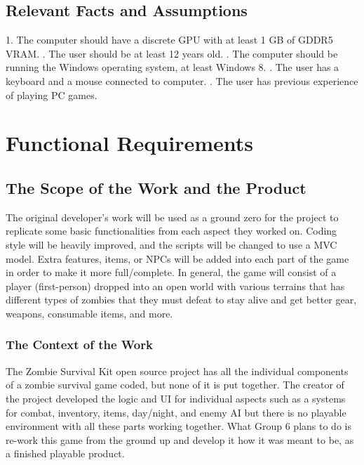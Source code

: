 \documentclass[12pt, titlepage]{article}
\begin{document}
\subsection{Relevant Facts and Assumptions}

1. The computer should have a discrete GPU with at least 1 GB of GDDR5 VRAM.
\newline
{}. The user should be at least 12 years old.
\newline
{}. The computer should be running the Windows operating system, at least Windows 8.
\newline
{}. The user has a keyboard and a mouse connected to computer.
\newline
{}. The user has previous experience of playing PC games.


\section{Functional Requirements}

\subsection{The Scope of the Work and the Product}
The original developer’s work will be used as a ground zero for the project to replicate some basic functionalities from each aspect they worked on. Coding style will be heavily improved, and the scripts will be changed to use a MVC model. Extra features, items, or NPCs will be added into each part of the game in order to make it more full/complete. In general, the game will consist of a player (first-person) dropped into an open world with various terrains that has different types of zombies that they must defeat to stay alive and get better gear, weapons, consumable items, and more.
\subsubsection{The Context of the Work}
The Zombie Survival Kit open source project has all the individual components of a zombie survival game coded, but none of it is put together. The creator of the project developed the logic and UI for individual aspects such as a systems for combat, inventory, items, day/night, and enemy AI but there is no playable environment with all these parts working together. What Group 6 plans to do is re-work this game from the ground up and develop it how it was meant to be, as a finished playable product. 
\end{document}
